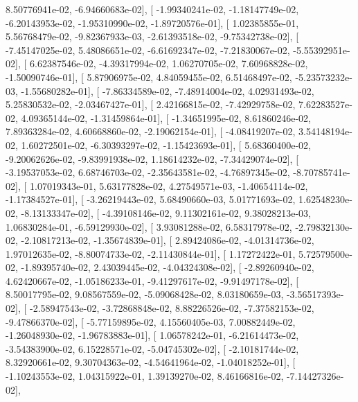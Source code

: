\documentclass{article}
\begin{document}
          8.50776941e-02,  -6.94660683e-02],
       [ -1.99340241e-02,  -1.18147749e-02,  -6.20143953e-02,
         -1.95310990e-02,  -1.89720576e-01],
       [  1.02385855e-01,   5.56768479e-02,  -9.82367933e-03,
         -2.61393518e-02,  -9.75342738e-02],
       [ -7.45147025e-02,   5.48086651e-02,  -6.61692347e-02,
         -7.21830067e-02,  -5.55392951e-02],
       [  6.62387546e-02,  -4.39317994e-02,   1.06270705e-02,
          7.60968828e-02,  -1.50090746e-01],
       [  5.87906975e-02,   4.84059455e-02,   6.51468497e-02,
         -5.23573232e-03,  -1.55680282e-01],
       [ -7.86334589e-02,  -7.48914004e-02,   4.02931493e-02,
          5.25830532e-02,  -2.03467427e-01],
       [  2.42166815e-02,  -7.42929758e-02,   7.62283527e-02,
          4.09365144e-02,  -1.31459864e-01],
       [ -1.34651995e-02,   8.61860246e-02,   7.89363284e-02,
          4.60668860e-02,  -2.19062154e-01],
       [ -4.08419207e-02,   3.54148194e-02,   1.60272501e-02,
         -6.30393297e-02,  -1.15423693e-01],
       [  5.68360400e-02,  -9.20062626e-02,  -9.83991938e-02,
          1.18614232e-02,  -7.34429074e-02],
       [ -3.19537053e-02,   6.68746703e-02,  -2.35643581e-02,
         -4.76897345e-02,  -8.70785741e-02],
       [  1.07019343e-01,   5.63177828e-02,   4.27549571e-03,
         -1.40654114e-02,  -1.17384527e-01],
       [ -3.26219443e-02,   5.68490660e-03,   5.01771693e-02,
          1.62548230e-02,  -8.13133347e-02],
       [ -4.39108146e-02,   9.11302161e-02,   9.38028213e-03,
          1.06830284e-01,  -6.59129930e-02],
       [  3.93081288e-02,   6.58317978e-02,  -2.79832130e-02,
         -2.10817213e-02,  -1.35674839e-01],
       [  2.89424086e-02,  -4.01314736e-02,   1.97012635e-02,
         -8.80074733e-02,  -2.11430844e-01],
       [  1.17272422e-01,   5.72579500e-02,  -1.89395740e-02,
          2.43039445e-02,  -4.04324308e-02],
       [ -2.89260940e-02,   4.62420667e-02,  -1.05186233e-01,
         -9.41297617e-02,  -9.91497178e-02],
       [  8.50017795e-02,   9.08567559e-02,  -5.09068428e-02,
          8.03180659e-03,  -3.56517393e-02],
       [ -2.58947543e-02,  -3.72868848e-02,   8.88226526e-02,
         -7.37582153e-02,  -9.47866370e-02],
       [ -5.77159895e-02,   4.15560405e-03,   7.00882449e-02,
         -1.26048930e-02,  -1.96783883e-01],
       [  1.06578242e-01,  -6.21614473e-02,  -3.54383900e-02,
          6.15228571e-02,  -5.04745302e-02],
       [ -2.10181744e-02,   8.32920661e-02,   9.30704363e-02,
         -4.54641964e-02,  -1.04018252e-01],
       [ -1.10243553e-02,   1.04315922e-01,   1.39139270e-02,
          8.46166816e-02,  -7.14427326e-02],
\end{document}
